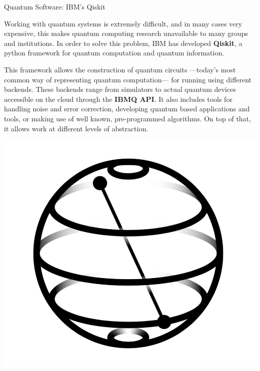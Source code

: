\documentclass[9pt, handout, aspectratio=169]{beamer}		%
\begin{document}
	\begin{frame}{Quantum Software: IBM's Qiskit}

		\medskip

		Working with quantum systems is extremely difficult, and in many cases very expensive, this makes quantum computing research unavailable to many groups and institutions. In order to solve this problem, IBM has developed \textbf{Qiskit}, a python framework for quantum computation and quantum information.

		\begin{multicols}{2}

			This framework allows the construction of quantum circuits ---today's most common way of representing quantum computation--- for running using different backends. These backends range from simulators to actual quantum devices accessible on the cloud through the \textbf{IBMQ API}. It also includes tools for handling noise and error correction, developing quantum based applications and tools, or making use of well known, pre-programmed algorithms. On top of that, it allows work at different levels of abstraction.

			\columnbreak

			\begin{center}
				\includegraphics[height=.44\paperheight]{Figures/qiskit}
			\end{center}

		\end{multicols}

	\end{frame}
\end{document}
